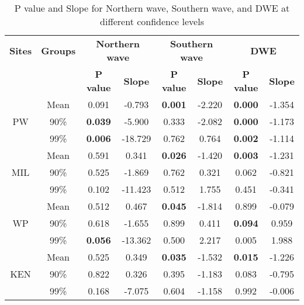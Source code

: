 \begin{table}[htbp]
\centering
\caption{P value and Slope for Northern wave, Southern wave, and DWE at different confidence levels}
\begin{tabular}{|c|c|cc|cc|cc|}
\hline
\textbf{Sites} &  \textbf{Groups}     & \multicolumn{2}{c|}{\textbf{Northern wave}} & \multicolumn{2}{c|}{\textbf{Southern wave}} & \multicolumn{2}{c|}{\textbf{DWE}} \\
\cline{3-8}
               &       & \textbf{P value} & \textbf{Slope} & \textbf{P value} & \textbf{Slope} & \textbf{P value} & \textbf{Slope} \\
\hline
\multirow{3}{*}{PW}  & Mean & 0.091 & -0.793 & \textbf{0.001} & -2.220 & \textbf{0.000} & -1.354 \\
                     & 90\% & \textbf{0.039} & -5.900 & 0.333 & -2.082 & \textbf{0.000} & -1.173 \\
                     & 99\% & \textbf{0.006} & -18.729 & 0.762 & 0.764 & \textbf{0.002} & -1.114 \\
\hline
\multirow{3}{*}{MIL} & Mean & 0.591 & 0.341 & \textbf{0.026} & -1.420 & \textbf{0.003} & -1.231 \\
                     & 90\% & 0.525 & -1.869 & 0.762 & 0.321 & 0.062 & -0.821 \\
                     & 99\% & 0.102 & -11.423 & 0.512 & 1.755 & 0.451 & -0.341 \\
\hline
\multirow{3}{*}{WP}  & Mean & 0.512 & 0.467 & \textbf{0.045} & -1.814 & 0.899 & -0.079 \\
                     & 90\% & 0.618 & -1.655 & 0.899 & 0.411 & \textbf{0.094} & 0.959 \\
                     & 99\% & \textbf{0.056} & -13.362 & 0.500 & 2.217 & 0.005 & 1.988 \\
\hline
\multirow{3}{*}{KEN} & Mean & 0.525 & 0.349 & \textbf{0.035} & -1.532 & \textbf{0.015} & -1.226 \\
                     & 90\% & 0.822 & 0.326 & 0.395 & -1.183 & 0.083 & -0.795 \\
                     & 99\% & 0.168 & -7.075 & 0.604 & -1.158 & 0.992 & -0.006 \\
\hline
\end{tabular}
\end{table}